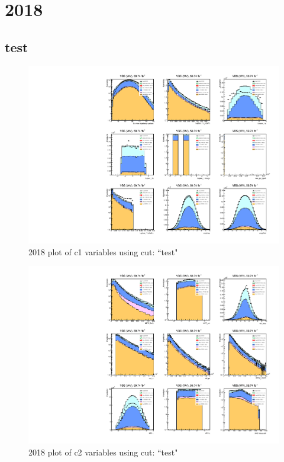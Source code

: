 \documentclass{article}
\begin{document}
    \section*{2018}
      \subsection*{test}
                        \begin{figure}[H]
                            \centering
                            \caption{2018 plot of c1 variables using cut: ``test"}
                            \includegraphics[width=\textwidth]{2018/c1_2018_test.pdf}
                        \end{figure}    
                        \begin{figure}[H]
                            \centering
                            \caption{2018 plot of c2 variables using cut: ``test"}
                            \includegraphics[width=\textwidth]{2018/c2_2018_test.pdf}
                        \end{figure}    
\end{document}
